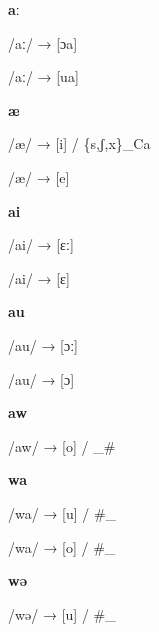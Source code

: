 \begin{center}\textbf{aː}\end{center}
\begin{multicols}{4}
\noindent /aː/ → [ɔa]

\noindent /aː/ → [ua]
\end{multicols}


\begin{center}\textbf{æ}\end{center}
\begin{multicols}{4}
\noindent /æ/ → [i] / \{s,ʃ,x\}\_Ca

\noindent /æ/ → [e]
\end{multicols}


\begin{center}\textbf{ai}\end{center}
\begin{multicols}{4}
\noindent /ai/ → [ɛː]

\noindent /ai/ → [ɛ]
\end{multicols}


\begin{center}\textbf{au}\end{center}
\begin{multicols}{4}
\noindent /au/ → [ɔː]

\noindent /au/ → [ɔ]
\end{multicols}


\begin{center}\textbf{aw}\end{center}
\begin{multicols}{4}
\noindent /aw/ → [o] / \_\#
\end{multicols}


\begin{center}\textbf{wa}\end{center}
\begin{multicols}{4}
\noindent /wa/ → [u] / \#\_

\noindent /wa/ → [o] / \#\_
\end{multicols}


\begin{center}\textbf{wə}\end{center}
\begin{multicols}{4}
\noindent /wə/ → [u] / \#\_
\end{multicols}


